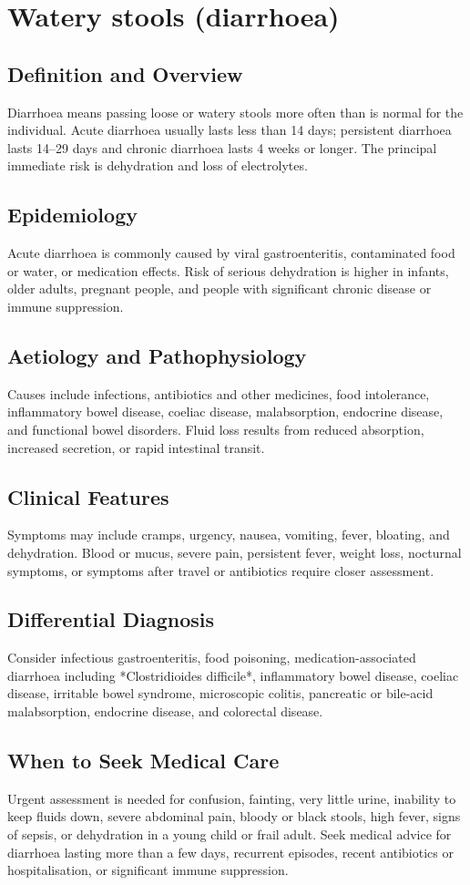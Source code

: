\chapter{Watery stools (diarrhoea)}
\section*{Definition and Overview}
Diarrhoea means passing loose or watery stools more often than is normal for the individual. Acute diarrhoea usually lasts less than 14 days; persistent diarrhoea lasts 14--29 days and chronic diarrhoea lasts 4 weeks or longer. The principal immediate risk is dehydration and loss of electrolytes.
\section*{Epidemiology}
Acute diarrhoea is commonly caused by viral gastroenteritis, contaminated food or water, or medication effects. Risk of serious dehydration is higher in infants, older adults, pregnant people, and people with significant chronic disease or immune suppression.
\section*{Aetiology and Pathophysiology}
Causes include infections, antibiotics and other medicines, food intolerance, inflammatory bowel disease, coeliac disease, malabsorption, endocrine disease, and functional bowel disorders. Fluid loss results from reduced absorption, increased secretion, or rapid intestinal transit.
\section*{Clinical Features}
Symptoms may include cramps, urgency, nausea, vomiting, fever, bloating, and dehydration. Blood or mucus, severe pain, persistent fever, weight loss, nocturnal symptoms, or symptoms after travel or antibiotics require closer assessment.
\section*{Differential Diagnosis}
Consider infectious gastroenteritis, food poisoning, medication-associated diarrhoea including *Clostridioides difficile*, inflammatory bowel disease, coeliac disease, irritable bowel syndrome, microscopic colitis, pancreatic or bile-acid malabsorption, endocrine disease, and colorectal disease.
\section*{When to Seek Medical Care}
Urgent assessment is needed for confusion, fainting, very little urine, inability to keep fluids down, severe abdominal pain, bloody or black stools, high fever, signs of sepsis, or dehydration in a young child or frail adult. Seek medical advice for diarrhoea lasting more than a few days, recurrent episodes, recent antibiotics or hospitalisation, or significant immune suppression.
